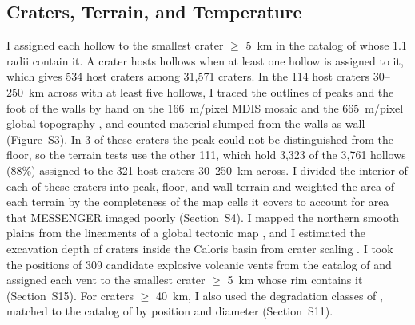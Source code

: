 \documentclass[article,review]{planetary}
\begin{document}
\subsection{Craters, Terrain, and Temperature}
\label{sec:craters}
I assigned each hollow to the smallest crater $\geq$ 5~km in the catalog of \textcite{herrick2018} whose 1.1 radii contain it. A crater hosts hollows when at least one hollow is assigned to it, which gives 534 host craters among 31,571 craters. In the 114 host craters 30--250~km across with at least five hollows, I traced the outlines of peaks and the foot of the walls by hand on the 166~m/pixel MDIS mosaic \parencite{denevi2018} and the 665~m/pixel global topography \parencite{becker2016}, and counted material slumped from the walls as wall (Figure~S3). In 3 of these craters the peak could not be distinguished from the floor, so the terrain tests use the other 111, which hold 3,323 of the 3,761 hollows (88\%) assigned to the 321 host craters 30--250~km across. I divided the interior of each of these craters into peak, floor, and wall terrain and weighted the area of each terrain by the completeness of the map cells it covers to account for area that MESSENGER imaged poorly (Section~S4). I mapped the northern smooth plains \parencite[Section~S6;][]{head2011} from the lineaments of a global tectonic map \parencite{klimczak2025}, and I estimated the excavation depth of craters inside the Caloris basin from crater scaling \parencite[Section~S7;][]{croft1985,melosh1989}. I took the positions of 309 candidate explosive volcanic vents from the catalog of \textcite{pegg2021} and assigned each vent to the smallest crater $\geq$ 5~km whose rim contains it (Section~S15). For craters $\geq$ 40~km, I also used the degradation classes of \textcite{kinczykMorphologicalEvaluationCrater2020}, matched to the catalog of \textcite{herrick2018} by position and diameter (Section~S11).
\end{document}
